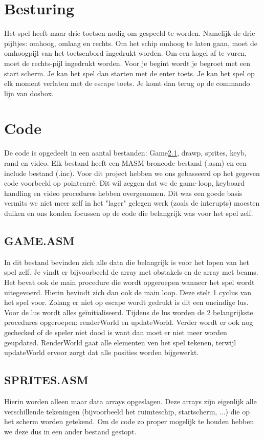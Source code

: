 \documentclass{article}
\begin{document}
\section{Besturing}

Het spel heeft maar drie toetsen nodig om gespeeld te worden. Namelijk de drie pijltjes: omhoog, omlaag en rechts.
Om het schip omhoog te laten gaan, moet de omhoogpijl van het toetsenbord ingedrukt worden.
Om een kogel af te vuren, moet de rechts-pijl ingedrukt worden.
Voor je begint wordt je begroet met een start scherm. Je kan het spel dan starten met de enter toets. 
Je kan het spel op elk moment verlaten met de escape toets. Je komt dan terug op de commando lijn van dosbox.

\section{Code}
De code is opgedeelt in een aantal bestanden: Game\ref{game_asm}, drawp, sprites, keyb, rand en video. Elk bestand heeft een MASM broncode bestand (.asm) en een include bestand (.inc).
Voor dit project hebben we ons gebasseerd op het gegeven code voorbeeld op pointcarr\'e. Dit wil zeggen dat we de game-loop, keyboard handling en video procedures hebben overgenomen. 
Dit was een goede basis vermits we niet meer zelf in het "lager" gelegen werk (zoals de interupts) moesten duiken en ons konden focussen op de code die belangrijk was voor het spel zelf.

\subsection{GAME.ASM}\label{game_asm}
In dit bestand bevinden zich alle data die belangrijk is voor het lopen van het spel zelf. Je vindt er bijvoorbeeld de array met obstakels en de array met beams.
Het bevat ook de main procedure die wordt opgeroepen wanneer het spel wordt uitegevoerd. Hierin bevindt zich dan ook de main loop. Deze stelt 1 cyclus van het spel voor.
Zolang er niet op escape wordt gedrukt is dit een oneindige lus. Voor de lus wordt alles geïnitialiseerd. Tijdens de lus worden de 2 belangrijkste procedures opgeroepen: renderWorld en updateWorld. 
Verder wordt er ook nog gechecked of de speler niet dood is want dan moet er niet meer worden geupdated.
RenderWorld gaat alle elementen ven het spel tekenen, terwijl updateWorld ervoor zorgt dat alle posities worden bijgewerkt.  %

\subsection{SPRITES.ASM}\label{sprites_asm}
Hierin worden alleen maar data arrays opgeslagen. Deze arrays zijn eigenlijk alle verschillende tekeningen (bijvoorbeeld het ruimteschip, startscherm, ...) die op het scherm worden getekend. Om de code zo proper mogelijk te houden hebben we deze dus in een ander bestand gestopt.
\end{document}
